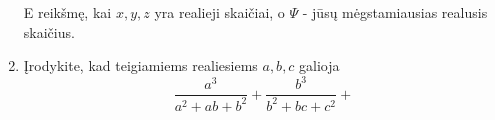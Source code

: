 \begin{enumerate}
    E reikšmę, kai $x,y,z$ yra realieji skaičiai, o $\Psi$ - jūsų
    mėgstamiausias realusis skaičius.
  \item \text{[LitMo 1987]} Įrodykite, kad teigiamiems realiesiems $a,b,c$
    galioja $$\frac{a^3}{a^2+ab+b^2} + \frac{b^3}{b^2+bc+c^2} +
$$
\end{enumerate}

